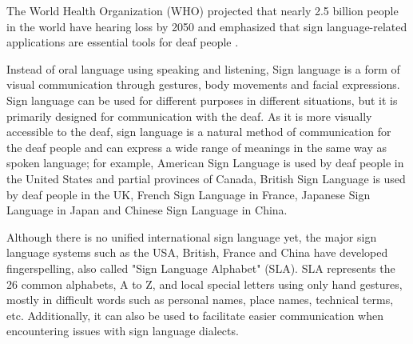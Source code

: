 The World Health Organization (WHO) projected that nearly 2.5 billion people in the world have hearing loss by 2050 and emphasized that sign language-related applications are essential tools for deaf people \cite{WHO2050}.

Instead of oral language using speaking and listening, Sign language is a form of visual communication through gestures, body movements and facial expressions. Sign language can be used for different purposes in different situations, but it is primarily designed for communication with the deaf. As it is more visually accessible to the deaf, sign language is a natural method of communication for the deaf people and can express a wide range of meanings in the same way as spoken language; for example, American Sign Language is used by deaf people in the United States and partial provinces of Canada, British Sign Language is used by deaf people in the UK, French Sign Language in France, Japanese Sign Language in Japan and Chinese Sign Language in China.

Although there is no unified international sign language yet, the major sign language systems such as the USA, British, France and China have developed fingerspelling, also called "Sign Language Alphabet" (SLA). SLA represents the 26 common alphabets, A to Z, and local special letters using only hand gestures, mostly in difficult words such as personal names, place names, technical terms, etc. Additionally, it can also be used to facilitate easier communication when encountering issues with sign language dialects. 

